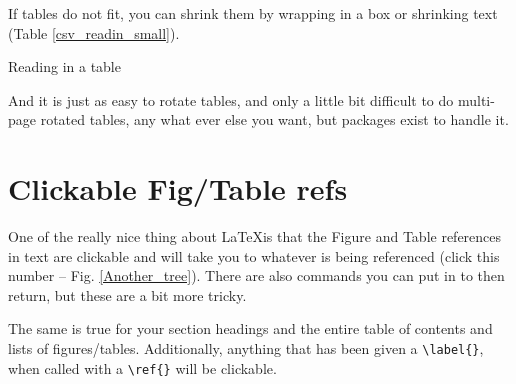 If tables do not fit, you can shrink them by wrapping in a box or shrinking text (Table \ref{csv_readin_small}).

\begin{table}[h]
\tiny %
\centering
\caption[Tiny table]{Reading in a table}
\label{csv_readin_small}
\end{table}

And it is just as easy to rotate tables, and only a little bit difficult to do multi-page rotated tables, any what ever else you want, but packages exist to handle it. 

\section{Clickable Fig/Table refs}

One of the really nice thing about \LaTeX is that the Figure and Table references in text are clickable and will take you to whatever is being referenced (click this number -- Fig. \ref{Another_tree}). There are also commands you can put in to then return, but these are a bit more tricky. 

The same is true for your section headings and the entire table of contents and lists of figures/tables. Additionally, anything that has been given a \verb+\label{}+, when called with a \verb+\ref{}+ will be clickable. 











